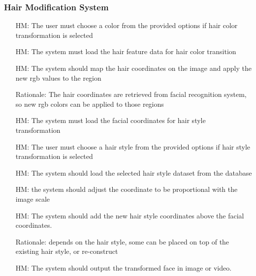 \documentclass[12pt]{article}
\newcounter{reqnum} %
\newcounter{hmreqnum} %
\begin{document}
\subsubsection{Hair Modification System}
    \begin{itemize}
        \item[HM\refstepcounter{hmreqnum}\thehmreqnum \label{R_Inputs}:] The user must choose a color from the provided options if hair color transformation is selected
        \item[HM\refstepcounter{hmreqnum}\thehmreqnum \label{R_Inputs}:] The system must load the hair feature data for hair color transition
        \item[HM\refstepcounter{hmreqnum}\thehmreqnum \label{R_Inputs}:] The system should map the hair coordinates on the image and apply the new rgb values to the region
        \item[] Rationale: The hair coordinates are retrieved from facial recognition system, so new rgb colors can be applied to those regions
        \item[HM\refstepcounter{hmreqnum}\thehmreqnum \label{R_Inputs}:] The system must load the facial coordinates for hair style transformation
        \item[HM\refstepcounter{hmreqnum}\thehmreqnum \label{R_Inputs}:] The user must choose a hair style from the provided options if hair style transformation is selected
        \item[HM\refstepcounter{hmreqnum}\thehmreqnum \label{R_Inputs}:] The system should load the selected hair style dataset from the database
        \item[HM\refstepcounter{hmreqnum}\thehmreqnum \label{R_Inputs}:] the system should adjust the coordinate to be proportional with the image scale
        \item[HM\refstepcounter{hmreqnum}\thehmreqnum \label{R_Inputs}:] The system should add the new hair style coordinates above the facial coordinates.
        \item[] Rationale: depends on the hair style, some can be placed on top of the existing hair style, or re-construct
        \item[HM\refstepcounter{hmreqnum}\thehmreqnum \label{R_Inputs}:] The system should output the transformed face in image or video.
    \end{itemize}
\end{document}
